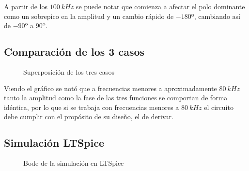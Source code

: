 \documentclass[11pt, a4paper]{article}
\begin{document}
A partir de los $100 \ kHz$ se puede notar que comienza a afectar el polo dominante como un sobrepico en la amplitud y un cambio rápido de $-180º$, cambiando así de $-90º$ a $90º$.

\subsection{Comparación de los 3 casos}	\label{sub:comparaciondelos3casos}
\begin{figure}[H]
	\begin{center}
		\caption{Superposición de los tres casos}
		\label{fig:comparacion3avolderivador}
	\end{center}
\end{figure}

Viendo el gráfico se notó que a frecuencias menores a aproximadamente $80 \ kHz$ tanto la amplitud como la fase de las tres funciones se comportan de forma idéntica, por lo que si se trabaja con frecuencias menores a $80 \ kHz$ el circuito debe cumplir con el propósito de su diseño, el de derivar.

\subsection{Simulación LTSpice}
\begin{figure}[H]
	\begin{center}
		\caption{Bode de la simulación en LTSpice}
		\label{fig:simulacionderivador}
	\end{center}
\end{figure}
\end{document}
